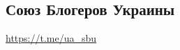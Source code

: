  
 
\subsection{Союз Блогеров Украины}
\label{sec:tg.ch.souz_blogerov_ukrainy}
\url{https://t.me/ua_sbu}
  

  
